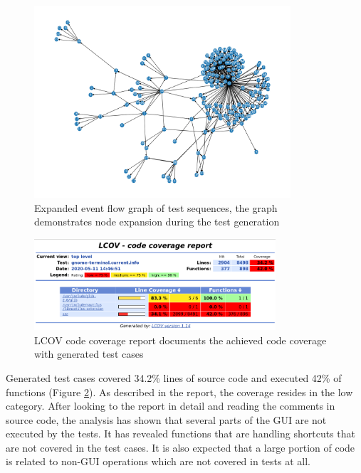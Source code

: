 \begin{figure}[H]
	\centering
	\includegraphics[width=0.85\textwidth,clip]{obrazky-figures/gnome-terminal_n_final.png}
	\caption{Expanded event flow graph of test sequences, the graph demonstrates node expansion during the test generation}
	\label{gnome-terminal-graph2}
\end{figure}

\begin{figure}[H]
	\centering
	\includegraphics[width=0.8\textwidth,clip]{obrazky-figures/gnome-termina-coverage.png}
	\caption{LCOV code coverage report documents the achieved code coverage with generated test cases}
	\label{gnome-terminal-coverage}
\end{figure}

Generated test cases covered 34.2\% lines of source code and executed 42\% of functions (Figure \ref{gnome-terminal-coverage}). As described in the report, the coverage resides in the low category. After looking to the report in detail and reading the comments in source code, the analysis has shown that several parts of the GUI are not executed by the tests. It has revealed functions that are handling shortcuts that are not covered in the test cases. It is also expected that a large portion of code is related to non-GUI operations which are not covered in tests at all.

